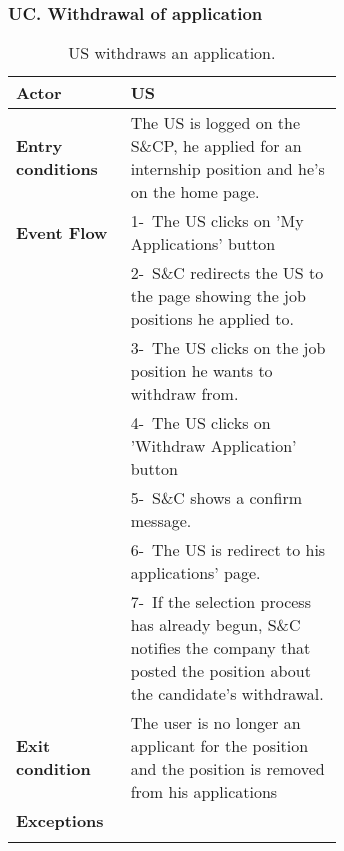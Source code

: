 \subsubsection*{UC\cuc . Withdrawal of application}
\begin{center}
    \begin{longtable}{|l|p{0.65\linewidth}|}
        \hline
        \textbf{Actor}            & US\\
        \hline
        \textbf{Entry conditions} & The US is logged on the S\&CP, he applied for an internship position and he's on the home page. \\
        \hline
        \textbf{Event Flow} & 1-\  The US clicks on 'My Applications' button\\
        & 2-\ S\&C redirects the US to the page showing the job positions he applied to. \\
        & 3-\ The US clicks on the job position he wants to withdraw from.\\
        & 4-\ The US clicks on 'Withdraw Application' button \\
        & 5-\ S\&C shows a confirm message.\\
        & 6-\ The US is redirect to his applications' page.\\
        & 7-\ If the selection process has already begun, S\&C notifies the company that posted the position about the candidate's withdrawal.\\
        \hline
        \textbf{Exit condition}   &  The user is no longer an applicant for the position and the position is removed from his applications \\
        \hline
        \textbf{Exceptions} &  \\
        \hline
        \caption{US withdraws an application.}
        \label{tab: us_recommendation_use_case}
    \end{longtable}
\end{center}

